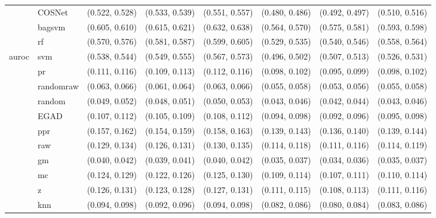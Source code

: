 \begin{table}[H]
{\begin{tabular}{llllllll}
 & COSNet & (0.522, 0.528) & (0.533, 0.539) & (0.551, 0.557) & (0.480, 0.486) & (0.492, 0.497) & (0.510, 0.516)\\

 & bagsvm & (0.605, 0.610) & (0.615, 0.621) & (0.632, 0.638) & (0.564, 0.570) & (0.575, 0.581) & (0.593, 0.598)\\

 & rf & (0.570, 0.576) & (0.581, 0.587) & (0.599, 0.605) & (0.529, 0.535) & (0.540, 0.546) & (0.558, 0.564)\\

\multirow{-15}{*}{\raggedright\arraybackslash auroc} & svm & (0.538, 0.544) & (0.549, 0.555) & (0.567, 0.573) & (0.496, 0.502) & (0.507, 0.513) & (0.526, 0.531)\\
\cmidrule{1-8}
 & pr & (0.111, 0.116) & (0.109, 0.113) & (0.112, 0.116) & (0.098, 0.102) & (0.095, 0.099) & (0.098, 0.102)\\

 & randomraw & (0.063, 0.066) & (0.061, 0.064) & (0.063, 0.066) & (0.055, 0.058) & (0.053, 0.056) & (0.055, 0.058)\\

 & random & (0.049, 0.052) & (0.048, 0.051) & (0.050, 0.053) & (0.043, 0.046) & (0.042, 0.044) & (0.043, 0.046)\\

 & EGAD & (0.107, 0.112) & (0.105, 0.109) & (0.108, 0.112) & (0.094, 0.098) & (0.092, 0.096) & (0.095, 0.098)\\

 & ppr & (0.157, 0.162) & (0.154, 0.159) & (0.158, 0.163) & (0.139, 0.143) & (0.136, 0.140) & (0.139, 0.144)\\

 & raw & (0.129, 0.134) & (0.126, 0.131) & (0.130, 0.135) & (0.114, 0.118) & (0.111, 0.116) & (0.114, 0.119)\\

 & gm & (0.040, 0.042) & (0.039, 0.041) & (0.040, 0.042) & (0.035, 0.037) & (0.034, 0.036) & (0.035, 0.037)\\

 & mc & (0.124, 0.129) & (0.122, 0.126) & (0.125, 0.130) & (0.109, 0.114) & (0.107, 0.111) & (0.110, 0.114)\\

 & z & (0.126, 0.131) & (0.123, 0.128) & (0.127, 0.131) & (0.111, 0.115) & (0.108, 0.113) & (0.111, 0.116)\\

 & knn & (0.094, 0.098) & (0.092, 0.096) & (0.094, 0.098) & (0.082, 0.086) & (0.080, 0.084) & (0.083, 0.086)\\


\end{tabular}}
\end{table}
